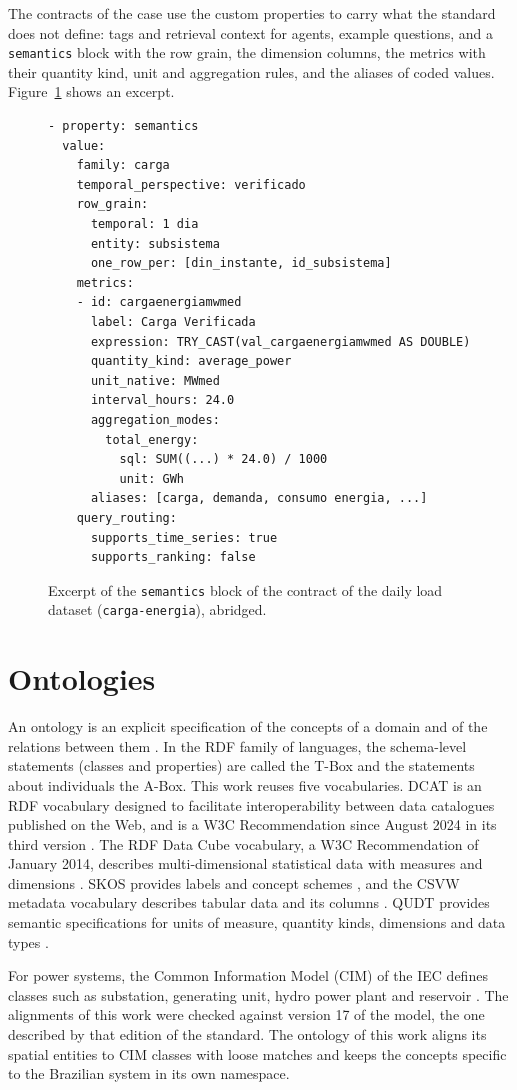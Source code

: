 The contracts of the case use the custom properties to carry what the standard does not
define: tags and retrieval context for agents, example questions, and a \texttt{semantics}
block with the row grain, the dimension columns, the metrics with their quantity kind, unit
and aggregation rules, and the aliases of coded values. Figure~\ref{fig:contract} shows an
excerpt.

\begin{figure}[ht]
\centering
\begin{minipage}{0.88\textwidth}
\footnotesize
\begin{verbatim}
- property: semantics
  value:
    family: carga
    temporal_perspective: verificado
    row_grain:
      temporal: 1 dia
      entity: subsistema
      one_row_per: [din_instante, id_subsistema]
    metrics:
    - id: cargaenergiamwmed
      label: Carga Verificada
      expression: TRY_CAST(val_cargaenergiamwmed AS DOUBLE)
      quantity_kind: average_power
      unit_native: MWmed
      interval_hours: 24.0
      aggregation_modes:
        total_energy:
          sql: SUM((...) * 24.0) / 1000
          unit: GWh
      aliases: [carga, demanda, consumo energia, ...]
    query_routing:
      supports_time_series: true
      supports_ranking: false
\end{verbatim}
\end{minipage}
\caption{Excerpt of the \texttt{semantics} block of the contract of the daily load dataset
(\texttt{carga-energia}), abridged.}
\label{fig:contract}
\end{figure}

\section{Ontologies}
An ontology is an explicit specification of the concepts of a domain and of the relations
between them \cite{gruber1993translation,studer1998knowledge}. In the RDF family of languages, the schema-level statements
(classes and properties) are called the T-Box and the statements about individuals the
A-Box. This work reuses five vocabularies. DCAT is an RDF vocabulary designed to facilitate
interoperability between data catalogues published on the Web, and is a W3C Recommendation
since August 2024 in its third version \cite{dcat3}. The RDF Data Cube vocabulary, a W3C
Recommendation of January 2014, describes multi-dimensional statistical data with measures
and dimensions \cite{datacube}. SKOS provides labels and concept schemes \cite{skos2009}, and
the CSVW metadata vocabulary describes tabular data and its columns \cite{csvw2015}. QUDT provides semantic specifications
for units of measure, quantity kinds, dimensions and data types \cite{qudt}.

For power systems, the Common Information Model (CIM) of the IEC defines classes such as
substation, generating unit, hydro power plant and reservoir \cite{iec61970301}. The
alignments of this work were checked against version 17 of the model, the one described by
that edition of the standard.
The ontology of this work aligns its spatial entities to CIM classes with loose matches and
keeps the concepts specific to the Brazilian system in its own namespace.
